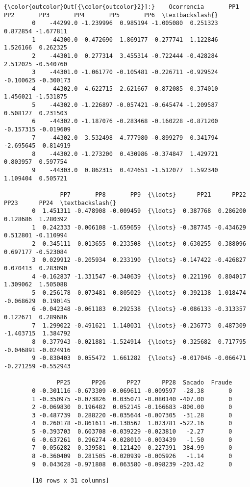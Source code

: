 \documentclass[11pt]{article}
\begin{document}
\begin{Verbatim}[commandchars=\\\{\}]
{\color{outcolor}Out[{\color{outcolor}2}]:}    Ocorrencia       PP1       PP2       PP3       PP4       PP5       PP6  \textbackslash{}
        0    -44299.0 -1.239996  0.985194 -1.005080  0.251323  0.872854 -1.677811   
        1    -44300.0 -0.472690  1.869177 -0.277741  1.122846  1.526166  0.262325   
        2    -44301.0  0.277314  3.455314 -0.722444 -0.428284  2.512025 -0.540760   
        3    -44301.0 -1.061770 -0.105481 -0.226711 -0.929524 -0.100625 -0.300173   
        4    -44302.0  4.622715  2.621667  0.872085  0.374010  1.456021 -1.531875   
        5    -44302.0 -1.226897 -0.057421 -0.645474 -1.209587  0.508127  0.231503   
        6    -44302.0 -1.187076 -0.283468 -0.160228 -0.871200 -0.157315 -0.019609   
        7    -44302.0  3.532498  4.777980 -0.899279  0.341794 -2.695645  0.814919   
        8    -44302.0 -1.273200  0.430986 -0.374847  1.429721  0.803957  0.597754   
        9    -44303.0  0.862315  0.424651 -1.512077  1.592340  1.109404  0.505721   
        
                PP7       PP8       PP9  {\ldots}      PP21      PP22      PP23      PP24  \textbackslash{}
        0  1.451311 -0.478908 -0.009459  {\ldots}  0.387768  0.286200  0.128686  1.280392   
        1  0.242333 -0.006108 -1.659659  {\ldots} -0.387745 -0.434629  0.512801 -0.110994   
        2  0.345111 -0.013655 -0.233508  {\ldots} -0.630255 -0.388096  0.697177 -0.523084   
        3  0.029912 -0.205934  0.233190  {\ldots} -0.147422 -0.426827  0.070413  0.283090   
        4 -0.162837 -1.331547 -0.340639  {\ldots}  0.221196  0.804017  1.309062  1.505088   
        5  0.256178 -0.073481 -0.805029  {\ldots}  0.392138  1.018474 -0.068629  0.190145   
        6 -0.042348 -0.061183  0.292538  {\ldots} -0.086133 -0.313357  0.122671  0.289686   
        7  1.299022 -0.491621  1.140031  {\ldots} -0.236773  0.487309 -1.403715  1.384792   
        8  0.377943 -0.021881 -1.524914  {\ldots}  0.325682  0.717795 -0.046891 -0.024916   
        9 -0.830403  0.055472  1.661282  {\ldots} -0.017046 -0.066471 -0.271259 -0.552943   
        
               PP25      PP26      PP27      PP28  Sacado  Fraude  
        0 -0.301116 -0.673309 -0.069611 -0.009597  -28.38       0  
        1 -0.350975 -0.073826  0.035071 -0.080140 -407.00       0  
        2 -0.069830  0.196482  0.052145 -0.166683 -800.00       0  
        3 -0.487739  0.288220 -0.035644 -0.007305  -31.28       0  
        4  0.260178 -0.861611 -0.130562  1.023781 -522.16       0  
        5 -0.393703  0.603708 -0.039229 -0.023810   -2.27       0  
        6 -0.637261  0.296274 -0.028010 -0.003439   -1.50       0  
        7  0.056282 -0.339581  0.121420 -0.227391 -384.99       0  
        8 -0.360409  0.281505 -0.020939 -0.005926   -1.14       0  
        9  0.043028 -0.971808  0.063580 -0.098239 -203.42       0  
        
        [10 rows x 31 columns]
\end{Verbatim}
            
\end{document}
